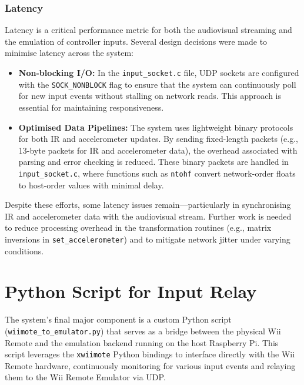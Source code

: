 \subsubsection*{Latency}

Latency is a critical performance metric for both the audiovisual streaming and the emulation of controller inputs. Several design decisions were made to minimise latency across the system:

\begin{itemize}
	\item \textbf{Non-blocking I/O:} In the \texttt{input\_socket.c} file, UDP sockets are configured with the \texttt{SOCK\_NONBLOCK} flag to ensure that the system can continuously poll for new input events without stalling on network reads. This approach is essential for maintaining responsiveness.

	\item \textbf{Optimised Data Pipelines:} The system uses lightweight binary protocols for both IR and accelerometer updates. By sending fixed-length packets (e.g., 13-byte packets for IR and accelerometer data), the overhead associated with parsing and error checking is reduced. These binary packets are handled in \texttt{input\_socket.c}, where functions such as \texttt{ntohf} convert network-order floats to host-order values with minimal delay.


\end{itemize}

Despite these efforts, some latency issues remain—particularly in synchronising IR and accelerometer data with the audiovisual stream. Further work is needed to reduce processing overhead in the transformation routines (e.g., matrix inversions in \texttt{set\_accelerometer}) and to mitigate network jitter under varying conditions.

\section{Python Script for Input Relay}
The system’s final major component is a custom Python script (\texttt{wiimote\_to\_emulator.py}) that serves as a bridge between the physical Wii Remote and the emulation backend running on the host Raspberry Pi. This script leverages the \texttt{xwiimote} Python bindings to interface directly with the Wii Remote hardware, continuously monitoring for various input events and relaying them to the Wii Remote Emulator via UDP.

